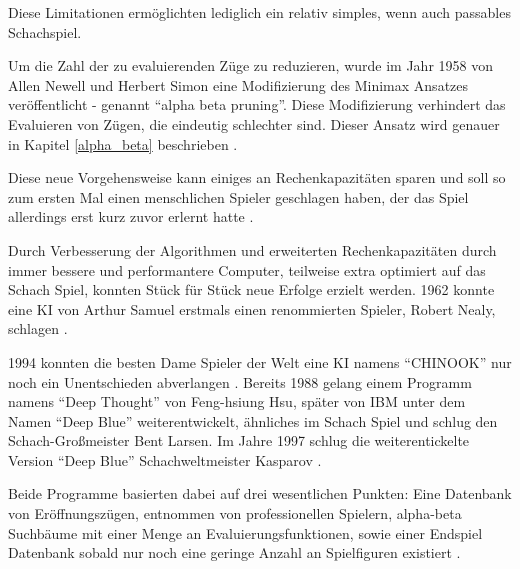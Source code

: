 
Diese Limitationen ermöglichten lediglich ein relativ simples, wenn auch passables Schachspiel.


Um die Zahl der zu evaluierenden Züge zu reduzieren, wurde im Jahr 1958 von Allen Newell und Herbert Simon eine Modifizierung des Minimax Ansatzes veröffentlicht - genannt ``alpha beta pruning''. Diese Modifizierung verhindert das Evaluieren von Zügen, die eindeutig schlechter sind. Dieser Ansatz wird genauer in Kapitel \ref{alpha_beta} beschrieben \cite{Newell2010}.


Diese neue Vorgehensweise kann einiges an Rechenkapazitäten sparen und soll so zum ersten Mal einen menschlichen Spieler geschlagen haben, der das Spiel allerdings erst kurz zuvor erlernt hatte \cite{Kurenkov2019}.

Durch Verbesserung der Algorithmen und erweiterten Rechenkapazitäten durch immer bessere und performantere Computer, teilweise extra optimiert auf das Schach Spiel, konnten Stück für Stück neue Erfolge erzielt werden. 1962 konnte eine KI von Arthur Samuel erstmals einen renommierten Spieler, Robert Nealy, schlagen \cite{Kurenkov2019}.

1994 konnten die besten Dame Spieler der Welt eine KI namens ``CHINOOK'' nur noch ein Unentschieden abverlangen  \cite{Schaeffer1996}. Bereits 1988 gelang einem Programm namens ``Deep Thought'' von Feng-hsiung Hsu, später von IBM unter dem Namen ``Deep Blue'' weiterentwickelt, ähnliches im Schach Spiel und schlug den Schach-Großmeister Bent Larsen. Im Jahre 1997 schlug die weiterentickelte Version ``Deep Blue'' Schachweltmeister Kasparov \cite{Kurenkov2019}.

Beide Programme basierten dabei auf drei wesentlichen Punkten: Eine Datenbank von Eröffnungszügen, entnommen von professionellen Spielern, alpha-beta Suchbäume mit einer Menge an Evaluierungsfunktionen, sowie einer Endspiel Datenbank sobald nur noch eine geringe Anzahl an Spielfiguren existiert \cite{Kurenkov2019}.

